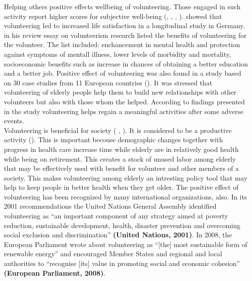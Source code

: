 \documentclass[10pt, letterpaper]{article}
\begin{document}
\begin{spacing}{1.4}
Helping others positive effects wellbeing of volunteering. Those engaged in such activity report higher scores for subjective well-being (\citet{haski09}, \citet{morrow2003}, \citep{thoits03}, \citep{whillans2016}). \citep{meier08} showed that volunteering led to increased life satisfaction in a longitudinal study in Germany. \citet{wilson12} in his review essay on volunteerism research  listed the benefits of volunteering for the volunteer. The list included: enchancement in mental health and protection against symptoms of mentall illness, lower levels of morbidity and mortality, socioeconomic benefits such as increase in chances of obtaining a better education and a better job. Positive effect of volunteering was also found in a study based on 30 case studies from 11 European countries (\citet{ehlers11}). It was stressed that volunteering of elderly people help them to build new relationships with other volunteers but also with those whom the helped. According to findings presented in the study volunteering helps regain a meaningful activities after some adverse events.   \\

Volunteering is beneficial for society ( \citet{Oecd15}, \cite{prouteau06}). It is considered to be a productive activity (\citet{hank09}). This is important becouse demographic changes together with progress in health care increase time while elderly  are in relatively good health while being on retirement. This creates a stock of unused labor among elderly that may be effectively used with benefit for volunteer and other members of a society.  This makes volunteering among elderly an intresting policy tool that may help to keep people in better health when they get older. The positive effect of volunteering has been recognized by many international organizations, also. In its 2001 recommendations the United Nations General Assembly identified volunteering as “an important component of any strategy aimed at poverty reduction, sustainable development, health, disaster prevention and overcoming social exclusion and discrimination” \textbf{(United Nations, 2001)}. In 2008, the European Parliament wrote about volunteering as “[the] most sustainable form of renewable energy” and encouraged Member States and regional and local authorities to “recognise [its] value in promoting social and economic cohesion” \textbf{(European Parliament, 2008)}. \\


\end{spacing}
\end{document}
